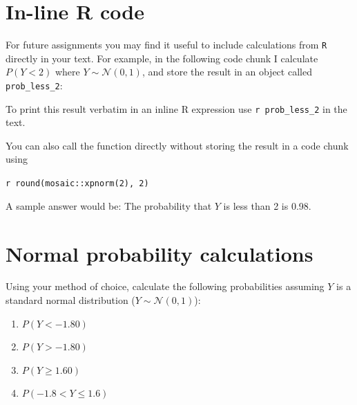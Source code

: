 \documentclass[letterpaper,12pt,twoside,]{pinp}
\providecommand{\tightlist}{%
  \setlength{\itemsep}{0pt}\setlength{\parskip}{0pt}}
\begin{document}
\hypertarget{in-line-r-code}{%
\section*{In-line R code}\label{in-line-r-code}}

For future assignments you may find it useful to include calculations
from \texttt{R} directly in your text. For example, in the following
code chunk I calculate \(P(Y < 2)\) where \(Y \sim \mathcal{N}(0,1)\),
and store the result in an object called \texttt{prob\_less\_2}:

\begin{Shaded}
\begin{Highlighting}[]

\end{Highlighting}
\end{Shaded}

To print this result verbatim in an inline R expression use
\texttt{\textasciigrave{}r\ prob\_less\_2\textasciigrave{}} in the text.

\vspace{0.1in}

You can also call the function directly without storing the result in a
code chunk using

\vspace{0.1in}

\texttt{\textasciigrave{}r\ round(mosaic::xpnorm(2),\ 2)\textasciigrave{}}

\vspace{0.1in}

A sample answer would be: The probability that \(Y\) is less than 2 is
0.98.

\newpage

\hypertarget{normal-probability-calculations}{%
\section{Normal probability
calculations}\label{normal-probability-calculations}}

Using your method of choice, calculate the following probabilities
assuming \(Y\) is a standard normal distribution
(\(Y \sim \mathcal{N}(0,1)\)):

\begin{enumerate}
\def\labelenumi{\alph{enumi})}
\tightlist
\item
  \(P(Y < -1.80)\)
\item
  \(P(Y > -1.80)\)
\item
  \(P(Y \geq 1.60)\)
\item
  \(P(-1.8 < Y \leq 1.6)\)
\end{enumerate}
\end{document}
